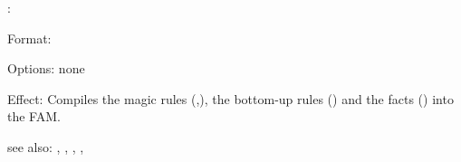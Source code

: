 :

Format: 

Options: none

Effect: Compiles the magic rules (,), 
        the bottom-up rules () 
        and the facts () into the FAM.
        


see also: , , , ,

